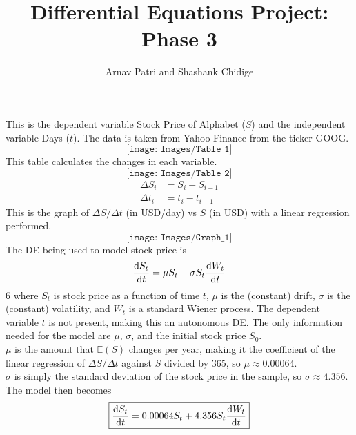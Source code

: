 \documentclass[12pt, A4]{article}
\title{Differential Equations Project: Phase 3}
\author{Arnav Patri and Shashank Chidige}
\newcommand{\Exp}{\mathbb{E}}
\begin{document}
	\maketitle
	\noindent
	This is the dependent variable Stock Price of Alphabet (\(S\)) and the independent variable Days (\(t\)). The data is taken from Yahoo Finance from the ticker GOOG. 
	\[\texttt{[image: Images/Table\_1]}\]
	This table calculates the changes in each variable.
	\[\texttt{[image: Images/Table\_2]}\]
	\begin{align*}
		\Delta S_i &= S_i - S_{i - 1} \tag{Equation 1*} \\
		\Delta t_i &= t_{i} - t_{i - 1} \tag{Equation 2**}
	\end{align*}
	This is the graph of \(\Delta S/\Delta t\) (in USD/day) vs \(S\) (in USD) with a linear regression performed.
	\[\texttt{[image: Images/Graph\_1]}\]
	The DE being used to model stock price is
		\[\dv{S_t}{t} = \mu S_t + \sigma S_t\dv{W_t}{t}\]6
		where \(S_t\) is stock price as a function of time \(t\), \(\mu\) is the (constant) drift, \(\sigma\) is the (constant) volatility, and \(W_t\) is a standard Wiener process. The dependent variable \(t\) is not present, making this an autonomous DE. The only information needed for the model are \(\mu\), \(\sigma\), and the initial stock price \(S_0\). \\
	\(\mu\) is the amount that \(\Exp(S)\) changes per year, making it the coefficient of the linear regression of \(\Delta S/\Delta t\) against \(S\) divided by 365, so \(\mu \approx 0.00064\). \\
	\(\sigma\) is simply the standard deviation of the stock price in the sample, so \(\sigma \approx 4.356\). \\
	The model then becomes
		\[\boxed{\dv{S_t}{t} = 0.00064S_t + 4.356S_t\dv{W_t}{t}}\]
		
\end{document}
